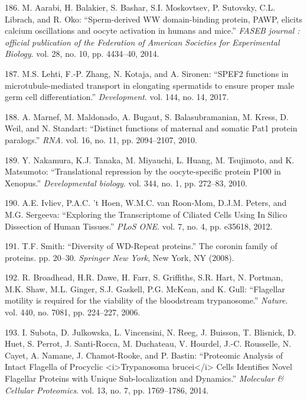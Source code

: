 \documentclass[12pt,twoside]{reedthesis}
\theoremstyle{definition}
\theoremstyle{definition}
\theoremstyle{remark}
\begin{document}
  \hypertarget{ref-Aarabi2014a}{}
  186. M. Aarabi, H. Balakier, S. Bashar, S.I. Moskovtsev, P. Sutovsky,
  C.L. Librach, and R. Oko: ``Sperm-derived WW domain-binding protein,
  PAWP, elicits calcium oscillations and oocyte activation in humans and
  mice.'' \emph{FASEB journal : official publication of the Federation of
  American Societies for Experimental Biology}. vol. 28, no. 10, pp.
  4434--40, 2014.
  
  \hypertarget{ref-Lehti2017}{}
  187. M.S. Lehti, F.-P. Zhang, N. Kotaja, and A. Sironen: ``SPEF2
  functions in microtubule-mediated transport in elongating spermatids to
  ensure proper male germ cell differentiation.'' \emph{Development}. vol.
  144, no. 14, 2017.
  
  \hypertarget{ref-Marnef2010}{}
  188. A. Marnef, M. Maldonado, A. Bugaut, S. Balasubramanian, M. Kress,
  D. Weil, and N. Standart: ``Distinct functions of maternal and somatic
  Pat1 protein paralogs.'' \emph{RNA}. vol. 16, no. 11, pp. 2094--2107,
  2010.
  
  \hypertarget{ref-Nakamura2010}{}
  189. Y. Nakamura, K.J. Tanaka, M. Miyauchi, L. Huang, M. Tsujimoto, and
  K. Matsumoto: ``Translational repression by the oocyte-specific protein
  P100 in Xenopus.'' \emph{Developmental biology}. vol. 344, no. 1, pp.
  272--83, 2010.
  
  \hypertarget{ref-Ivliev2012}{}
  190. A.E. Ivliev, P.A.C. 't Hoen, W.M.C. van Roon-Mom, D.J.M. Peters,
  and M.G. Sergeeva: ``Exploring the Transcriptome of Ciliated Cells Using
  In Silico Dissection of Human Tissues.'' \emph{PLoS ONE}. vol. 7, no. 4,
  pp. e35618, 2012.
  
  \hypertarget{ref-Smith2008}{}
  191. T.F. Smith: ``Diversity of WD-Repeat proteins.'' The coronin family
  of proteins. pp. 20--30. \emph{Springer New York}, New York, NY (2008).
  
  \hypertarget{ref-Broadhead2006}{}
  192. R. Broadhead, H.R. Dawe, H. Farr, S. Griffiths, S.R. Hart, N.
  Portman, M.K. Shaw, M.L. Ginger, S.J. Gaskell, P.G. McKean, and K. Gull:
  ``Flagellar motility is required for the viability of the bloodstream
  trypanosome.'' \emph{Nature}. vol. 440, no. 7081, pp. 224--227, 2006.
  
  \hypertarget{ref-Subota2014}{}
  193. I. Subota, D. Julkowska, L. Vincensini, N. Reeg, J. Buisson, T.
  Blisnick, D. Huet, S. Perrot, J. Santi-Rocca, M. Duchateau, V. Hourdel,
  J.-C. Rousselle, N. Cayet, A. Namane, J. Chamot-Rooke, and P. Bastin:
  ``Proteomic Analysis of Intact Flagella of Procyclic
  \textless{}i\textgreater{}Trypanosoma brucei\textless{}/i\textgreater{}
  Cells Identifies Novel Flagellar Proteins with Unique Sub-localization
  and Dynamics.'' \emph{Molecular \& Cellular Proteomics}. vol. 13, no. 7,
  pp. 1769--1786, 2014.
  
\end{document}
